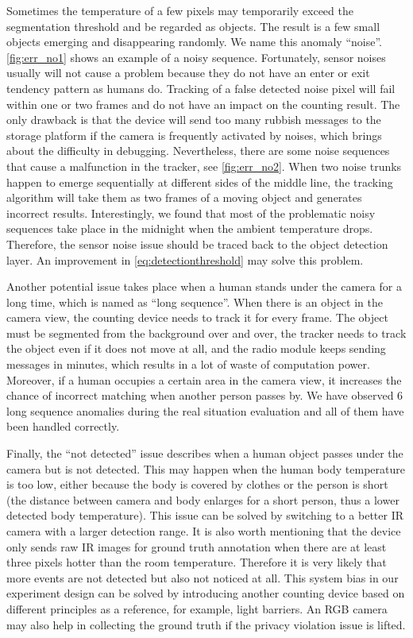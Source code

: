 Sometimes the temperature of a few pixels may temporarily exceed the segmentation threshold and be regarded as objects. The result is a few small objects emerging and disappearing randomly. We name this anomaly ``noise''. \autoref{fig:err_no1} shows an example of a noisy sequence. Fortunately, sensor noises usually will not cause a problem because they do not have an enter or exit tendency pattern as humans do. Tracking of a false detected noise pixel will fail within one or two frames and do not have an impact on the counting result. The only drawback is that the device will send too many rubbish messages to the storage platform if the camera is frequently activated by noises, which brings about the difficulty in debugging. Nevertheless, there are some noise sequences that cause a malfunction in the tracker, see \autoref{fig:err_no2}. When two noise trunks happen to emerge sequentially at different sides of the middle line, the tracking algorithm will take them as two frames of a moving object and generates incorrect results. Interestingly, we found that most of the problematic noisy sequences take place in the midnight when the ambient temperature drops. Therefore, the sensor noise issue should be traced back to the object detection layer. An improvement in \autoref{eq:detectionthreshold} may solve this problem.

Another potential issue takes place when a human stands under the camera for a long time, which is named as ``long sequence''. When there is an object in the camera view, the counting device needs to track it for every frame. The object must be segmented from the background over and over, the tracker needs to track the object even if it does not move at all, and the radio module keeps sending messages in minutes, which results in a lot of waste of computation power. Moreover, if a human occupies a certain area in the camera view, it increases the chance of incorrect matching when another person passes by. We have observed 6 long sequence anomalies during the real situation evaluation and all of them have been handled correctly.

Finally, the ``not detected'' issue describes when a human object passes under the camera but is not detected. This may happen when the human body temperature is too low, either because the body is covered by clothes or the person is short (the distance between camera and body enlarges for a short person, thus a lower detected body temperature). This issue can be solved by switching to a better IR camera with a larger detection range. It is also worth mentioning that the device only sends raw IR images for ground truth annotation when there are at least three pixels hotter than the room temperature. Therefore it is very likely that more events are not detected but also not noticed at all. This system bias in our experiment design can be solved by introducing another counting device based on different principles as a reference, for example, light barriers. An RGB camera may also help in collecting the ground truth if the privacy violation issue is lifted.

